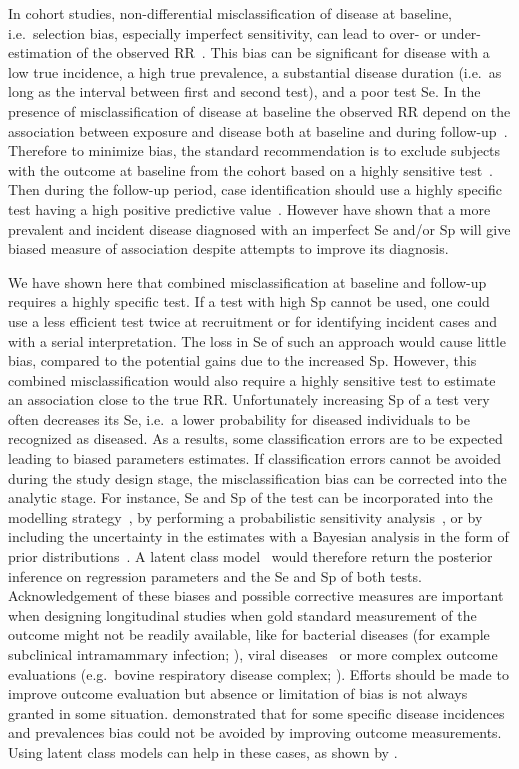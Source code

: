 In cohort studies, non-differential misclassification of disease at baseline,
i.e.\ selection bias, especially imperfect sensitivity, can lead to over- or
under-estimation of the observed RR~\citep{Pekkanen2006}.
This bias can be significant for disease with a low true incidence, a high true
prevalence, a substantial disease duration (i.e.\ as long as the interval between
first and second test), and a poor test Se.
In the presence of misclassification of disease at baseline the observed RR
depend on the association between exposure and disease both at baseline and
during follow-up~\citep{Pekkanen2006}.
Therefore to minimize bias, the standard recommendation is to exclude subjects
with the outcome at baseline from the cohort based on a highly sensitive
test~\citep{Pekkanen2008}.
Then during the follow-up period, case identification should use a highly
specific test having a high positive predictive value~\citep{Brenner1993}.
However \cite{Haine2017} have shown that a more prevalent and incident disease
diagnosed with an imperfect Se and/or Sp will give biased measure of association
despite attempts to improve its diagnosis.

We have shown here that combined misclassification at baseline and follow-up
requires a highly specific test.
If a test with high Sp cannot be used, one could use a less efficient test twice
at recruitment or for identifying incident cases and with a serial
interpretation.
The loss in Se of such an approach would cause little bias, compared to the
potential gains due to the increased Sp.
However, this combined misclassification would also require a highly sensitive
test to estimate an association close to the true RR.
Unfortunately increasing Sp of a test very often decreases its Se, i.e.\ a lower
probability for diseased individuals to be recognized as diseased.
As a results, some classification errors are to be expected leading to biased
parameters estimates.
If classification errors cannot be avoided during the study design stage, the
misclassification bias can be corrected into the analytic stage.
For instance, Se and Sp of the test can be incorporated into the modelling
strategy~\citep{Magder1997}, by performing a probabilistic sensitivity
analysis~\citep{Fox_2005}, or by including the uncertainty in the estimates with
a Bayesian analysis in the form of prior distributions~\citep{McInturff2004}.
A latent class model~\citep{Hui1980} would therefore return the posterior
inference on regression parameters and the Se and Sp of both tests.
Acknowledgement of these biases and possible corrective measures are important
when designing longitudinal studies when gold standard measurement of the
outcome might not be readily available, like for bacterial diseases (for example
subclinical intramammary infection; \citealp{Koop2013}), viral
diseases~\citep{Dotti2013} or more complex outcome evaluations (e.g.\ bovine
respiratory disease complex; \citealp{Buczinski2015}).
Efforts should be made to improve outcome evaluation but absence or limitation of
bias is not always granted in some situation.
\cite{Haine2017} demonstrated that for some specific disease incidences and
prevalences bias could not be avoided by improving outcome measurements.
Using latent class models can help in these cases, as shown by \cite{Dufour2012}.

